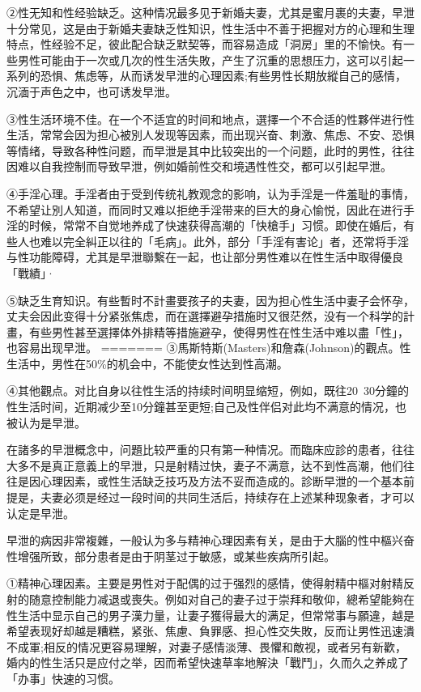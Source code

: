 \documentclass[12pt,UTF8]{ctexbook}
\begin{document}
②性无知和性经验缺乏。这种情况最多见于新婚夫妻，尤其是蜜月裹的夫妻，早泄十分常见，这是由于新婚夫妻缺乏性知识，性生活中不善于把握对方的心理和生理特点，性经验不足，彼此配合缺乏默契等，而容易造成「洞房」里的不愉快。有一些男性可能由于一次或几次的性生活失敗，产生了沉重的思想压力，这可以引起一系列的恐惧、焦虑等，从而诱发早泄的心理因素;有些男性长期放縱自己的感情，沉湎于声色之中，也可诱发早泄。

③性生活环境不佳。在一个不适宜的时间和地点，選擇一个不合适的性夥伴进行性生活，常常会因为担心被別人发现等因素，而出现兴奋、刺激、焦虑、不安、恐惧等情绪，导致各种性问题，而早泄是其中比较突出的一个问题，此时的男性，往往因难以自我控制而导致早泄，例如婚前性交和境遇性性交，都可以引起早泄。

④手淫心理。手淫者由于受到传统礼教观念的影响，认为手淫是一件羞耻的事情，不希望让別人知道，而同时又难以拒绝手淫带来的巨大的身心愉悦，因此在进行手淫的时候，常常不自觉地养成了快速获得高潮的「快槍手」习惯。即使在婚后，有些人也难以完全糾正以往的「毛病」。此外，部分「手淫有害论」者，还常将手淫与性功能障碍，尤其是早泄聯繫在一起，也让部分男性难以在性生活中取得優良「戰績」·

⑤缺乏生育知识。有些暫时不計畫要孩子的夫妻，因为担心性生活中妻子会怀孕，丈夫会因此变得十分紧张焦虑，而在選擇避孕措施时又很茫然，没有一个科学的計畫，有些男性甚至選擇体外排精等措施避孕，使得男性在性生活中难以盡「性」，也容易出现早泄。
=======
③馬斯特斯(Masters)和詹森(Johnson)的觀点。性生活中，男性在50\%的机会中，不能使女性达到性高潮。

④其他觀点。对比自身以往性生活的持续时间明显缩短，例如，既往20~30分鐘的性生活时间，近期减少至10分鐘甚至更短;自己及性伴侣对此均不满意的情况，也被认为是早泄。

在諸多的早泄概念中，问題比较严重的只有第一种情况。而臨床应診的患者，往往大多不是真正意義上的早泄，只是射精过快，妻子不满意，达不到性高潮，他们往往是因心理因素，或性生活缺乏技巧及方法不妥而造成的。診断早泄的一个基本前提是，夫妻必须是经过一段时间的共同生活后，持续存在上述某种现象者，才可以认定是早泄。

早泄的病因非常複雜，一般认为多与精神心理因素有关，是由于大腦的性中樞兴奋性增强所致，部分患者是由于阴茎过于敏感，或某些疾病所引起。

①精神心理因素。主要是男性对于配偶的过于强烈的感情，使得射精中樞对射精反射的随意控制能力减退或喪失。例如对自己的妻子过于崇拜和敬仰，總希望能夠在性生活中显示自己的男子漢力量，让妻子獲得最大的满足，但常常事与願違，越是希望表现好却越是糟糕，紧张、焦慮、負罪感、担心性交失敗，反而让男性迅速潰不成軍;相反的情况更容易理解，对妻子感情淡薄、畏懼和敵视，或者另有新歡，婚内的性生活只是应付之举，因而希望快速草率地解決「戰鬥」，久而久之养成了「办事」快速的习惯。
\end{document}

